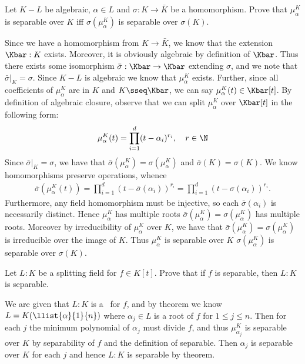 \documentclass{article}
\begin{document}
\begin{subexercise}
  Let \( K-L \) be algebraic, \( \alpha\in L \) and \( \sigma:K\to \bar K \) be a homomorphism.
  Prove that \( \mu_\alpha^K \) is separable over \( K \) iff \( \sigma(\mu_\alpha^K) \) is separable over \( \sigma(K) \).
\end{subexercise}
\begin{solution}
  Since we have a homomorphism from \( K\to \bar K \), we know that the extension \( \Kbar:K \) exists.
  Moreover, it is obviously algebraic by definition of \( \Kbar \).
  Thus there exists some isomorphism \( \bar\sigma:\Kbar\to\Kbar \) extending \( \sigma \), and we note that \( \bar\sigma|_{K} = \sigma \).
  Since \( K-L \) is algebraic we know that \( \mu_\alpha^K \) exists.
  Further, since all coefficients of \( \mu_\alpha^K \) are in \( K \) and \( K \sseq \Kbar \), we can say \( \mu_\alpha^K(t)\in \Kbar[t] \).
  By definition of algebraic closure, observe that we can split \( \mu_\alpha^K \) over \( \Kbar[t] \) in the following form: \begin{align*}
    \mu_\alpha^K(t) = \prod_{i=1}^{d}(t-\alpha_i)^{r_i},\quad r\in \N
  \end{align*}
  Since \( \bar\sigma|_{K} = \sigma \), we have that \( \bar\sigma(\mu_\alpha^K) = \sigma(\mu_\alpha^K) \) and \( \bar\sigma(K) = \sigma(K) \).
  We know homomorphisms preserve operations, whence
  \begin{align*}
    \bar\sigma\left(\mu_\alpha^K(t)\right) = \prod_{i=1}^{d}(t-\bar\sigma(\alpha_i))^{r_i} = \prod_{i=1}^{d}(t-\sigma(\alpha_i))^{r_i}.
  \end{align*}
  Furthermore, any field homomorphism must be injective, so each \( \bar\sigma(\alpha_i) \) is necessarily distinct.
  Hence \( \mu_\alpha^K \) has multiple roots \iff \( \bar\sigma(\mu_\alpha^K)=\sigma(\mu_\alpha^K) \) has multiple roots.
  Moreover by irreducibility of \( \mu_\alpha^K \) over \( K \), we have that \( \bar\sigma(\mu_\alpha^K) = \sigma(\mu_\alpha^K) \) is irreducible over the image of \( K \).
  Thus \( \mu_\alpha^K \) is separable over \( K \) \iff \( \sigma(\mu_\alpha^K) \) is separable over \( \sigma(K) \).
\end{solution}

\begin{subexercise} \label{ex:sfe1}
  Let \( L:K \) be a splitting field for \( f\in K[t] \).
  Prove that if \( f \) is separable, then \( L:K \) is separable.
\end{subexercise}
\begin{solution}
  We are given that \( L:K \) is a \sfe~for \( f \), and by theorem we know \( L=K(\llist{\alpha}{1}{n}) \) where \( \alpha_j\in L \) is a root of \( f \) for \( 1\leq j\leq n \).
  Then for each \( j \) the minimum polynomial of \( \alpha_j \) must divide \( f \), and thus \( \mu_{\alpha_j}^K \) is separable over \( K \) by separability of \( f \) and the definition of separable.
  Then \( \alpha_j \) is separable over \( K \) for each \( j \) and hence \( L:K \) is separable by theorem.
\end{solution}
\end{document}
